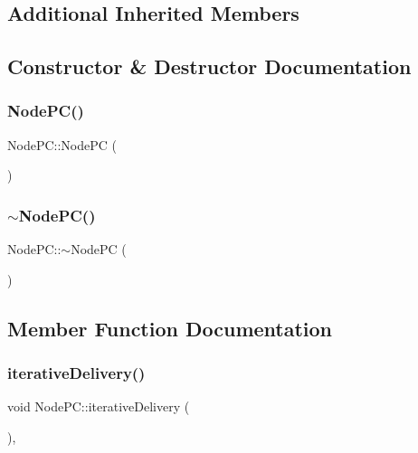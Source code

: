 \subsection*{Additional Inherited Members}


\subsection{Constructor \& Destructor Documentation}
\mbox{\label{classNodePC_a0b937d3f3d409fd1a8d1c15170d97675}} 
\subsubsection{\texorpdfstring{Node\+P\+C()}{NodePC()}}
{\footnotesize\ttfamily Node\+P\+C\+::\+Node\+PC (\begin{DoxyParamCaption}{ }\end{DoxyParamCaption})}

\mbox{\label{classNodePC_a823ec7244202157115f6d587c0c565dc}} 
\subsubsection{\texorpdfstring{$\sim$\+Node\+P\+C()}{~NodePC()}}
{\footnotesize\ttfamily Node\+P\+C\+::$\sim$\+Node\+PC (\begin{DoxyParamCaption}{ }\end{DoxyParamCaption})\hspace{0.3cm}{\ttfamily [virtual]}}



\subsection{Member Function Documentation}
\mbox{\label{classNodePC_a7ac363db597ebadd3b18dd4343440aa1}} 
\subsubsection{\texorpdfstring{iterative\+Delivery()}{iterativeDelivery()}}
{\footnotesize\ttfamily void Node\+P\+C\+::iterative\+Delivery (\begin{DoxyParamCaption}{ }\end{DoxyParamCaption})\hspace{0.3cm}{\ttfamily [protected]}, {\ttfamily [virtual]}}



